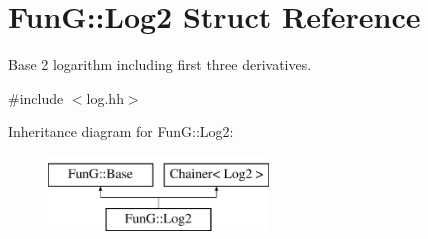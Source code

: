 \hypertarget{structFunG_1_1Log2}{\section{Fun\-G\-:\-:Log2 Struct Reference}
\label{structFunG_1_1Log2}
}


Base 2 logarithm including first three derivatives.  




{\ttfamily \#include $<$log.\-hh$>$}

Inheritance diagram for Fun\-G\-:\-:Log2\-:\begin{figure}[H]
\begin{center}
\leavevmode
\includegraphics[height=2.000000cm]{structFunG_1_1Log2}
\end{center}
\end{figure}
